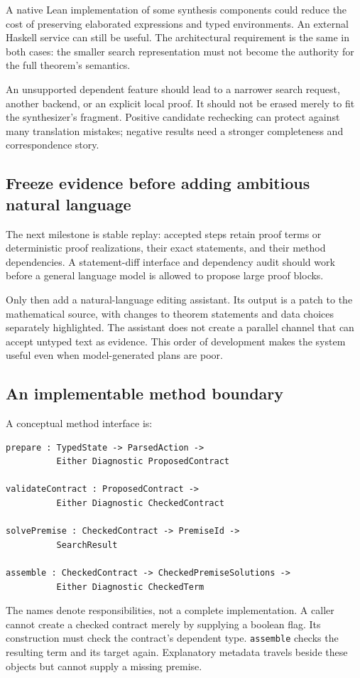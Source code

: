 \documentclass[11pt,a4paper]{article}
\newcommand{\code}[1]{\texttt{#1}}
\theoremstyle{remark}
\begin{document}
A native Lean implementation of some synthesis components could reduce the cost of preserving elaborated expressions and typed environments. An external Haskell service can still be useful. The architectural requirement is the same in both cases: the smaller search representation must not become the authority for the full theorem's semantics.

An unsupported dependent feature should lead to a narrower search request, another backend, or an explicit local proof. It should not be erased merely to fit the synthesizer's fragment. Positive candidate rechecking can protect against many translation mistakes; negative results need a stronger completeness and correspondence story.

\subsection{Freeze evidence before adding ambitious natural language}

The next milestone is stable replay: accepted steps retain proof terms or deterministic proof realizations, their exact statements, and their method dependencies. A statement-diff interface and dependency audit should work before a general language model is allowed to propose large proof blocks.

Only then add a natural-language editing assistant. Its output is a patch to the mathematical source, with changes to theorem statements and data choices separately highlighted. The assistant does not create a parallel channel that can accept untyped text as evidence. This order of development makes the system useful even when model-generated plans are poor.

\subsection{An implementable method boundary}

A conceptual method interface is:
\begin{lstlisting}
prepare : TypedState -> ParsedAction ->
          Either Diagnostic ProposedContract

validateContract : ProposedContract ->
          Either Diagnostic CheckedContract

solvePremise : CheckedContract -> PremiseId ->
          SearchResult

assemble : CheckedContract -> CheckedPremiseSolutions ->
          Either Diagnostic CheckedTerm
\end{lstlisting}
The names denote responsibilities, not a complete implementation. A caller cannot create a checked contract merely by supplying a boolean flag. Its construction must check the contract's dependent type. \code{assemble} checks the resulting term and its target again. Explanatory metadata travels beside these objects but cannot supply a missing premise.
\end{document}
